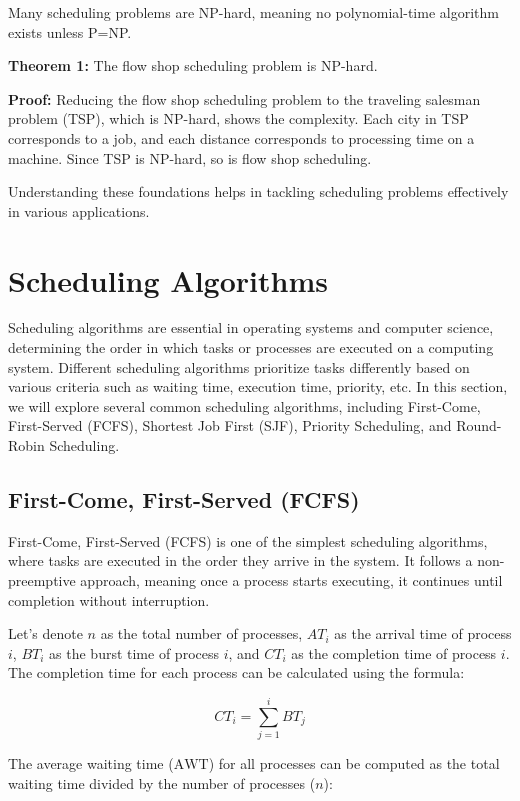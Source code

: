 \documentclass[12pt]{book} %
\begin{document}
Many scheduling problems are NP-hard, meaning no polynomial-time algorithm exists unless P=NP.

\textbf{Theorem 1:} The flow shop scheduling problem is NP-hard.

\textbf{Proof:} 
Reducing the flow shop scheduling problem to the traveling salesman problem (TSP), which is NP-hard, shows the complexity. Each city in TSP corresponds to a job, and each distance corresponds to processing time on a machine. Since TSP is NP-hard, so is flow shop scheduling.

Understanding these foundations helps in tackling scheduling problems effectively in various applications.



\section{Scheduling Algorithms}

Scheduling algorithms are essential in operating systems and computer science, determining the order in which tasks or processes are executed on a computing system. Different scheduling algorithms prioritize tasks differently based on various criteria such as waiting time, execution time, priority, etc. In this section, we will explore several common scheduling algorithms, including First-Come, First-Served (FCFS), Shortest Job First (SJF), Priority Scheduling, and Round-Robin Scheduling.

\subsection{First-Come, First-Served (FCFS)}

First-Come, First-Served (FCFS) is one of the simplest scheduling algorithms, where tasks are executed in the order they arrive in the system. It follows a non-preemptive approach, meaning once a process starts executing, it continues until completion without interruption.

Let's denote $n$ as the total number of processes, $AT_i$ as the arrival time of process $i$, $BT_i$ as the burst time of process $i$, and $CT_i$ as the completion time of process $i$. The completion time for each process can be calculated using the formula:

\[
CT_i = \sum_{j=1}^{i} BT_j
\]

The average waiting time ($\text{AWT}$) for all processes can be computed as the total waiting time divided by the number of processes ($n$):
\end{document}
